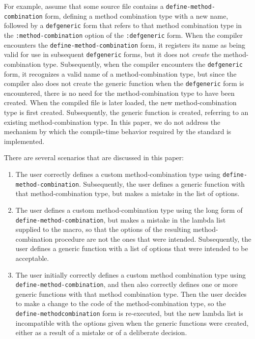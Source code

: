 For example, assume that some source file contains a
\texttt{define-method-combination} form, defining a method combination
type with a new name, followed by a \texttt{defgeneric} form that
refers to that method combination type in the
\texttt{:method-combination} option of the \texttt{:defgeneric} form.
When the compiler encounters the \texttt{define-method-combination}
form, it registers its name as being valid for use in subsequent
\texttt{defgeneric} forms, but it does not \emph{create} the
method-combination type.  Subsequently, when the compiler encounters
the \texttt{defgeneric} form, it recognizes a valid name of a
method-combination type, but since the compiler also does not create
the generic function when the \texttt{defgeneric} form is encountered,
there is no need for the method-combination type to have been created.
When the compiled file is later loaded, the new method-combination
type is first created.  Subsequently, the generic function is created,
referring to an existing method-combination type.  In this paper, we
do not address the mechanism by which the compile-time behavior
required by the standard is implemented.

There are several scenarios that are discussed in this paper:

\begin{enumerate}
\item The user correctly defines a custom method-combination type
  using \texttt{define-method-combination}.  Subsequently, the user
  defines a generic function with that method-combination type, but
  makes a mistake in the list of options.
\item The user defines a custom method-combination type using the long
  form of \texttt{define-method-combination}, but makes a mistake in
  the lambda list supplied to the macro, so that the options of the
  resulting method-combination procedure are not the ones that were
  intended.  Subsequently, the user defines a generic function with a
  list of options that were intended to be acceptable.
\item The user initially correctly defines a custom method combination
  type using \texttt{define-method-combination}, and then also
  correctly defines one or more generic functions with that method
  combination type.  Then the user decides to make a change to the
  code of the method-combination type, so the
  \texttt{define-method\-combination} form is re-executed, but the new
  lambda list is incompatible with the options given when the generic
  functions were created, either as a result of a mistake or of a
  deliberate decision.
\end{enumerate}

